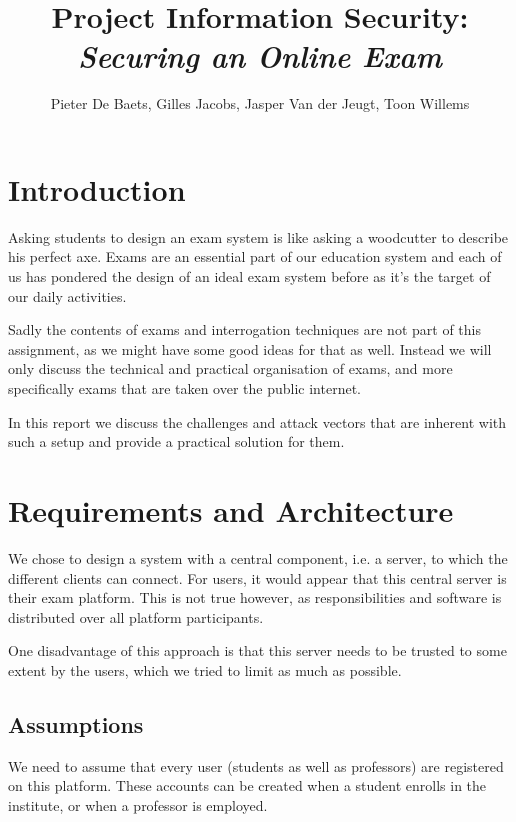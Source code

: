 \documentclass{article}
\title{Project Information Security: \\ \emph{Securing an Online Exam}}
\author{Pieter De Baets, Gilles Jacobs, Jasper Van der Jeugt, Toon Willems}
\begin{document}
\maketitle
\tableofcontents

\newpage

\section{Introduction}
\label{sec:introduction}

Asking students to design an exam system is like asking a woodcutter to describe
his perfect axe. Exams are an essential part of our education system and each of
us has pondered the design of an ideal exam system before as it's the target of
our daily activities.

Sadly the contents of exams and interrogation techniques are not part of this
assignment, as we might have some good ideas for that as well. Instead we will
only discuss the technical and practical organisation of exams, and more
specifically exams that are taken over the public internet.

In this report we discuss the challenges and attack vectors that are inherent
with such a setup and provide a practical solution for them.

\section{Requirements and Architecture}
\label{sec:requirements}

We chose to design a system with a central component, i.e. a server, to which
the different clients can connect. For users, it would appear that this central
server is their exam platform. This is not true however, as responsibilities and
software is distributed over all platform participants.

One disadvantage of this approach is that this server needs to be trusted to
some extent by the users, which we tried to limit as much as possible.

\subsection{Assumptions}
\label{subsec:req-assumptions}

We need to assume that every user (students as well as professors) are
registered on this platform. These accounts can be created when a student
enrolls in the institute, or when a professor is employed.
\end{document}
